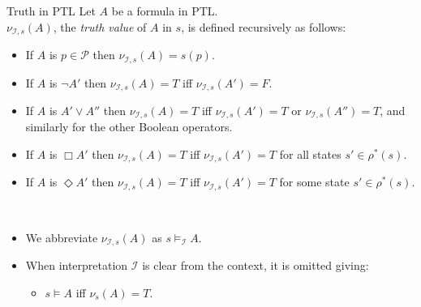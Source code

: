 \begin{wideslide}[bm=,toc=]{Truth in PTL}
Let $A$ be a formula in PTL.\\
$\nu_{\mathcal{I},s}(A)$, the {\em truth value\/} of $A$ in $s$, is defined recursively as follows:
\begin{itemize}
\item<2-> If $A$ is $p\in\mathcal{P}$ then $\nu_{\mathcal{I},s}(A) = s(p)$.
\item<3-> If $A$ is $\neg A'$ then $\nu_{\mathcal{I},s}(A) = T$ iff $\nu_{\mathcal{I},s}(A') = F$.
\item<4-> If $A$ is $A'\vee A''$ then $\nu_{\mathcal{I},s}(A) = T$ iff $\nu_{\mathcal{I},s}(A') = T$ or
$\nu_{\mathcal{I},s}(A'') = T$, and similarly for the other Boolean operators.

\item<5-> If $A$ is $\Box A'$ then $\nu_{\mathcal{I},s}(A) = T$ iff $\nu_{\mathcal{I},s}(A') = T$ for
all states $s'\in\rho^*(s)$.

\item<6-> If $A$ is $\Diamond A'$ then $\nu_{\mathcal{I},s}(A) = T$ iff $\nu_{\mathcal{I},s}(A') = T$ for
some state $s'\in\rho^*(s)$.

\end{itemize}
\\
\begin{itemize}
\item<8-> We abbreviate $\nu_{\mathcal{I},s}(A)$ as $s\models_\mathcal{I} A$. 
\item<9-> When interpretation $\mathcal{I}$ is clear from the context, it is omitted
giving: 
\begin{itemize}
\item<10-> $s\models A$ iff $\nu_s(A) = T$.
\end{itemize}
\end{itemize}
\end{wideslide}




